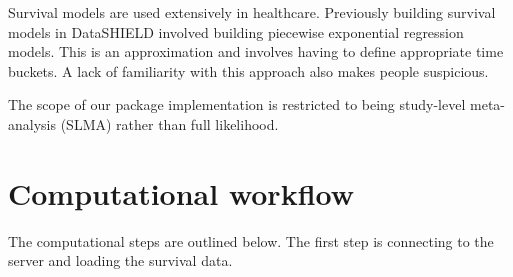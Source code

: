 \documentclass[
]{book}
\begin{document}
Survival models are used extensively in healthcare. Previously building survival models in DataSHIELD involved building piecewise exponential regression models. This is an approximation and involves having to define appropriate time buckets. A lack of familiarity with this approach also makes people suspicious.

The scope of our package implementation is restricted to being study-level meta-analysis (SLMA) rather than full likelihood.

\hypertarget{computational-workflow}{%
\chapter{Computational workflow}\label{computational-workflow}}

The computational steps are outlined below.
The first step is connecting to the server and loading the survival data.
\end{document}
